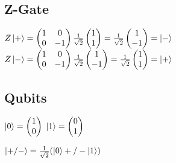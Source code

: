 \documentclass[a4]{article}
\begin{document}
\subsection{Z-Gate}
\begin{center}
$Z\ket{+} = \begin{pmatrix}1 & 0\\0 & -1\end{pmatrix}\frac{1}{\sqrt{2}}\begin{pmatrix}1\\1\end{pmatrix} = \frac{1}{\sqrt{2}}\begin{pmatrix}1\\-1\end{pmatrix} = \ket{-}$\\\vspace{5mm}
$Z\ket{-} = \begin{pmatrix}1 & 0\\0 & -1\end{pmatrix}\frac{1}{\sqrt{2}}\begin{pmatrix}1\\-1\end{pmatrix} = \frac{1}{\sqrt{2}}\begin{pmatrix}1\\1\end{pmatrix} = \ket{+}$
\end{center}






\subsection{Qubits}
\begin{center}
$\ket{0} = \begin{pmatrix}1\\0\end{pmatrix}$\hspace{10mm}
$\ket{1} = \begin{pmatrix}0\\1\end{pmatrix}$
\end{center}
\vspace{5mm}
\begin{center}
$\ket{+/-} = \frac{1}{\sqrt{2}}(\ket{0} +/- \ket{1})$
\end{center}
\end{document}
